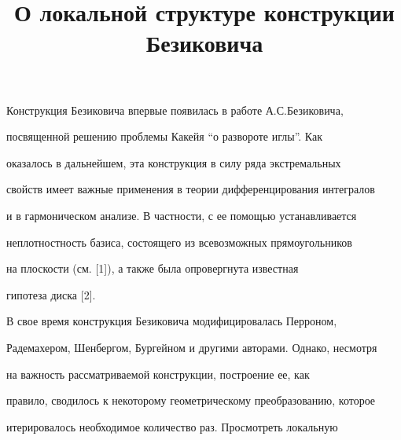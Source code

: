 

\title{О локальной структуре конструкции Безиковича}  


  


\date{}  




  


\pagestyle{plain} %


  


  




 


\maketitle 


 


Конструкция Безиковича впервые появилась в работе А.С.Безиковича, 


посвященной решению проблемы Какейя ``о развороте иглы''. Как 


оказалось в дальнейшем, эта конструкция в силу ряда экстремальных 


свойств имеет важные применения в теории дифференцирования интегралов 


и в гармоническом анализе. В частности, с ее помощью устанавливается 


неплотностность базиса, состоящего из всевозможных прямоугольников 


на плоскости (см. [1]), а также была опровергнута известная 


гипотеза диска [2]. 


 


В свое время конструкция Безиковича модифицировалась Перроном, 


Радемахером, Шенбергом, Бургейном и другими авторами. Однако, несмотря 


на важность рассматриваемой конструкции, построение ее, как 


правило, сводилось к некоторому геометрическому преобразованию, которое 


итерировалось необходимое количество раз. Просмотреть локальную 


